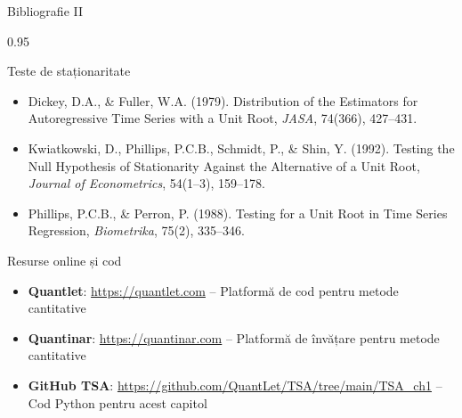 \documentclass[9pt, aspectratio=169, t]{beamer}
\begin{document}
\begin{frame}{Bibliografie II}
    \begin{cminipage}{0.95\textwidth}
        \begin{block}{Teste de staționaritate}
            {\small
            \begin{itemize}\setlength{\itemsep}{0pt}
                \item Dickey, D.A., \& Fuller, W.A. (1979). Distribution of the Estimators for Autoregressive Time Series with a Unit Root, \textit{JASA}, 74(366), 427--431.
                \item Kwiatkowski, D., Phillips, P.C.B., Schmidt, P., \& Shin, Y. (1992). Testing the Null Hypothesis of Stationarity Against the Alternative of a Unit Root, \textit{Journal of Econometrics}, 54(1--3), 159--178.
                \item Phillips, P.C.B., \& Perron, P. (1988). Testing for a Unit Root in Time Series Regression, \textit{Biometrika}, 75(2), 335--346.
            \end{itemize}
            }
        \end{block}

        \begin{exampleblock}{Resurse online și cod}
            {\small
            \begin{itemize}\setlength{\itemsep}{0pt}
                \item \textbf{Quantlet}: \url{https://quantlet.com} -- Platformă de cod pentru metode cantitative
                \item \textbf{Quantinar}: \url{https://quantinar.com} -- Platformă de învățare pentru metode cantitative
                \item \textbf{GitHub TSA}: \url{https://github.com/QuantLet/TSA/tree/main/TSA_ch1} -- Cod Python pentru acest capitol
            \end{itemize}
            }
        \end{exampleblock}
    \end{cminipage}
\end{frame}
\end{document}
